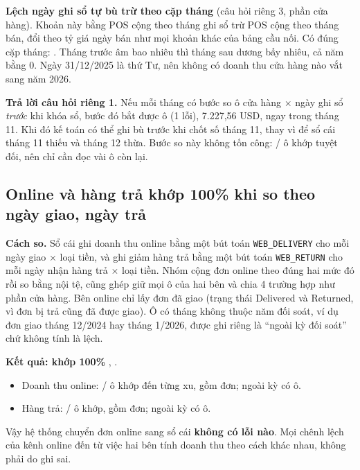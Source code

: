 \textbf{Lệch ngày ghi sổ tự bù trừ theo cặp tháng} (câu hỏi riêng 3, phần cửa hàng). Khoản này bằng POS cộng theo tháng ghi sổ trừ POS cộng theo tháng bán, đổi theo tỷ giá ngày bán như mọi khoản khác của bảng cầu nối. Có đúng \SoSoCapThang{} cặp tháng: \SoCapThang{}. Tháng trước âm bao nhiêu thì tháng sau dương bấy nhiêu, cả năm bằng 0. Ngày 31/12/2025 là thứ Tư, nên không có doanh thu cửa hàng nào vắt sang năm 2026.

\textbf{Trả lời câu hỏi riêng 1.} Nếu mỗi tháng có bước so ô cửa hàng $\times$ ngày ghi sổ \emph{trước} khi khóa sổ, bước đó bắt được \SoOCuaHangLech{} ô (1 lỗi), 7.227,56 USD, ngay trong tháng 11. Khi đó kế toán có thể ghi bù trước khi chốt số tháng 11, thay vì để sổ cái tháng 11 thiếu và tháng 12 thừa. Bước so này không tốn công: \SoOCuaHangKhop{}/\SoOCuaHang{} ô khớp tuyệt đối, nên chỉ cần đọc vài ô còn lại.

\subsection{Online và hàng trả khớp 100\% khi so theo ngày giao, ngày trả}

\textbf{Cách so.} Sổ cái ghi doanh thu online bằng một bút toán \texttt{WEB\_DELIVERY} cho mỗi ngày giao $\times$ loại tiền, và ghi giảm hàng trả bằng một bút toán \texttt{WEB\_RETURN} cho mỗi ngày nhận hàng trả $\times$ loại tiền. Nhóm cộng đơn online theo đúng hai mức đó rồi so bằng nội tệ, cũng ghép giữ mọi ô của hai bên và chia 4 trường hợp như phần cửa hàng. Bên online chỉ lấy đơn đã giao (trạng thái Delivered và Returned, vì đơn bị trả cũng đã được giao). Ô có tháng không thuộc năm đối soát, ví dụ đơn giao tháng 12/2024 hay tháng 1/2026, được ghi riêng là ``ngoài kỳ đối soát'' chứ không tính là lệch.

\textbf{Kết quả: khớp 100\%} , .
\begin{itemize}
  \item Doanh thu online: \SoOOnlineKhop{}/\SoOOnline{} ô khớp đến từng xu, gồm \SoDonGiao{} đơn; ngoài kỳ có \SoOOnlineNgoaiKy{} ô.
  \item Hàng trả: \SoOHangTraKhop{}/\SoOHangTra{} ô khớp, gồm \SoDonTra{} đơn; ngoài kỳ có \SoOHangTraNgoaiKy{} ô.
\end{itemize}
Vậy hệ thống chuyển đơn online sang sổ cái \textbf{không có lỗi nào}. Mọi chênh lệch của kênh online đến từ việc hai bên tính doanh thu theo cách khác nhau, không phải do ghi sai.

